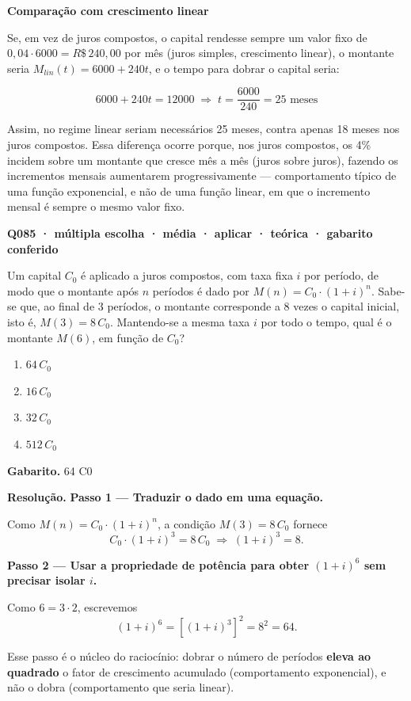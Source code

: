 \documentclass[11pt,a4paper]{article}
\begin{document}
\textbf{Comparação com crescimento linear}

Se, em vez de juros compostos, o capital rendesse sempre um valor fixo de $0,04\cdot 6000 = R\$\,240,00$ por mês (juros simples, crescimento linear), o montante seria $M_{lin}(t) = 6000 + 240t$, e o tempo para dobrar o capital seria:

$$6000 + 240t = 12000 \;\Rightarrow\; t = \dfrac{6000}{240} = 25 \text{ meses}$$

Assim, no regime linear seriam necessários 25 meses, contra apenas 18 meses nos juros compostos. Essa diferença ocorre porque, nos juros compostos, os 4\% incidem sobre um montante que cresce mês a mês (juros sobre juros), fazendo os incrementos mensais aumentarem progressivamente — comportamento típico de uma função exponencial, e não de uma função linear, em que o incremento mensal é sempre o mesmo valor fixo.

\bigskip\noindent\textbf{Q085 · múltipla escolha · média · aplicar · teórica · gabarito conferido}\par\nopagebreak
Um capital $C_0$ é aplicado a juros compostos, com taxa fixa $i$ por período, de modo que o montante após $n$ períodos é dado por $M(n) = C_0\cdot(1+i)^n$. Sabe-se que, ao final de 3 períodos, o montante corresponde a 8 vezes o capital inicial, isto é, $M(3) = 8\,C_0$. Mantendo-se a mesma taxa $i$ por todo o tempo, qual é o montante $M(6)$, em função de $C_0$?
\begin{enumerate}[label=(\alph*)]
\item $64\,C_0$
\item $16\,C_0$
\item $32\,C_0$
\item $512\,C_0$
\end{enumerate}

\textbf{Gabarito.} 64 C0

\textbf{Resolução.} \textbf{Passo 1 — Traduzir o dado em uma equação.}

Como $M(n) = C_0\cdot(1+i)^n$, a condição $M(3) = 8\,C_0$ fornece
$$C_0\cdot(1+i)^3 = 8\,C_0 \;\Rightarrow\; (1+i)^3 = 8.$$

\textbf{Passo 2 — Usar a propriedade de potência para obter $(1+i)^6$ sem precisar isolar $i$.}

Como $6 = 3\cdot 2$, escrevemos
$$(1+i)^6 = \left[(1+i)^3\right]^2 = 8^2 = 64.$$

Esse passo é o núcleo do raciocínio: dobrar o número de períodos \textbf{eleva ao quadrado} o fator de crescimento acumulado (comportamento exponencial), e não o dobra (comportamento que seria linear).
\end{document}
